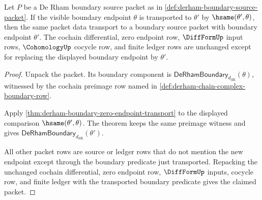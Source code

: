 \begin{theorem}
\label{thm:derham-boundary-source-stability}
Let $P$ be a De Rham boundary source packet as in
\autoref{def:derham-boundary-source-packet}. If the visible boundary endpoint
$\theta$ is transported to $\theta'$ by $\hsame(\theta',\theta)$, then the same
packet data transport to a boundary source packet with boundary endpoint
$\theta'$. The cochain differential, zero endpoint row, $\DiffFormUp$ input
rows, $\CohomologyUp$ cocycle row, and finite ledger rows are unchanged except
for replacing the displayed boundary endpoint by $\theta'$.
\end{theorem}
\begin{proof}
Unpack the packet. Its boundary component is
$\mathsf{DeRhamBoundary}_{d_{\mathrm{dR}}}(\theta)$, witnessed by the cochain
preimage row named in \autoref{def:derham-chain-complex-boundary-row}.

Apply \autoref{thm:derham-boundary-zero-endpoint-transport} to the displayed
comparison $\hsame(\theta',\theta)$. The theorem keeps the same preimage
witness and gives
$\mathsf{DeRhamBoundary}_{d_{\mathrm{dR}}}(\theta')$.

All other packet rows are source or ledger rows that do not mention the new
endpoint except through the boundary predicate just transported. Repacking the
unchanged cochain differential, zero endpoint row, $\DiffFormUp$ inputs,
cocycle row, and finite ledger with the transported boundary predicate gives
the claimed packet.
\end{proof}

